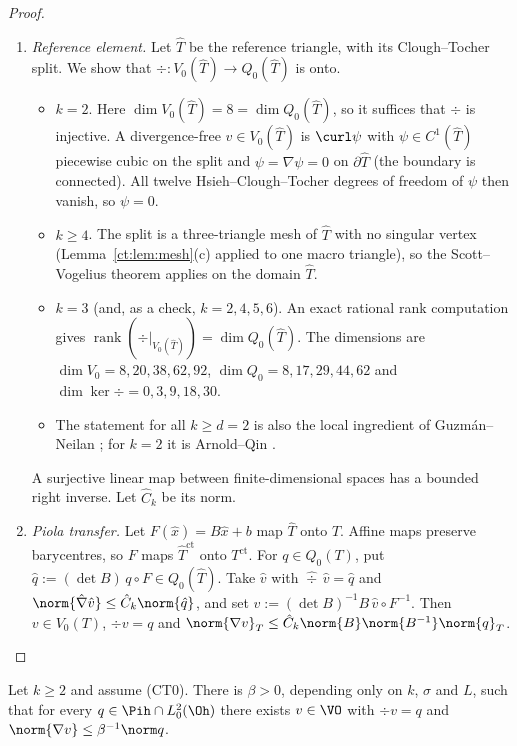 \begin{proof}
\begin{enumerate}
\item \emph{Reference element.} Let $\hat T$ be the reference triangle, with its Clough--Tocher split. We show that $\div:V_0(\hat T)\to Q_0(\hat T)$ is onto.
\begin{itemize}
\item $k=2$. Here $\dim V_0(\hat T)=8=\dim Q_0(\hat T)$, so it suffices that $\div$ is injective. A divergence-free $v\in V_0(\hat T)$ is $\curl\psi$ with $\psi\in C^1(\hat T)$ piecewise cubic on the split and $\psi=\nabla\psi=0$ on $\partial\hat T$ (the boundary is connected). All twelve Hsieh--Clough--Tocher degrees of freedom of $\psi$ \cite{CloughTocher1965,Ciarlet1978book} then vanish, so $\psi=0$.
\item $k\ge4$. The split is a three-triangle mesh of $\hat T$ with no singular vertex (Lemma~\ref{ct:lem:mesh}(c) applied to one macro triangle), so the Scott--Vogelius theorem \cite{ScottVogelius1985,GuzmanScott2019} applies on the domain $\hat T$.
\item $k=3$ (and, as a check, $k=2,4,5,6$). An exact rational rank computation gives $\operatorname{rank}(\div|_{V_0(\hat T)})=\dim Q_0(\hat T)$. The dimensions are $\dim V_0=8,20,38,62,92$, $\dim Q_0=8,17,29,44,62$ and $\dim\ker\div=0,3,9,18,30$.
\item The statement for all $k\ge d=2$ is also the local ingredient of Guzm\'an--Neilan \cite{GuzmanNeilan2018}; for $k=2$ it is Arnold--Qin \cite{ArnoldQin1992}.
\end{itemize}
A surjective linear map between finite-dimensional spaces has a bounded right inverse. Let $\hat C_k$ be its norm.
\item \emph{Piola transfer.} Let $F(\hat x)=B\hat x+b$ map $\hat T$ onto $T$. Affine maps preserve barycentres, so $F$ maps $\hat T^{\mathrm{ct}}$ onto $T^{\mathrm{ct}}$. For $q\in Q_0(T)$, put $\hat q:=(\det B)\,q\circ F\in Q_0(\hat T)$. Take $\hat v$ with $\widehat\div\,\hat v=\hat q$ and $\norm{\hat\nabla\hat v}\le\hat C_k\norm{\hat q}$, and set $v:=(\det B)^{-1}B\,\hat v\circ F^{-1}$. Then $v\in V_0(T)$, $\div v=q$ and $\norm{\nabla v}_T\le\hat C_k\norm{B}\norm{B^{-1}}\norm{q}_T$.\qedhere
\end{enumerate}
\end{proof}

\begin{lemma}\label{ct:lem:infsup}
Let $k\ge2$ and assume (CT0). There is $\beta>0$, depending only on $k$, $\sigma$ and $L$, such that for every $q\in\Pih\cap L^2_0(\Oh)$ there exists $v\in\VO$ with $\div v=q$ and $\norm{\nabla v}\le\beta^{-1}\norm q$.
\end{lemma}

